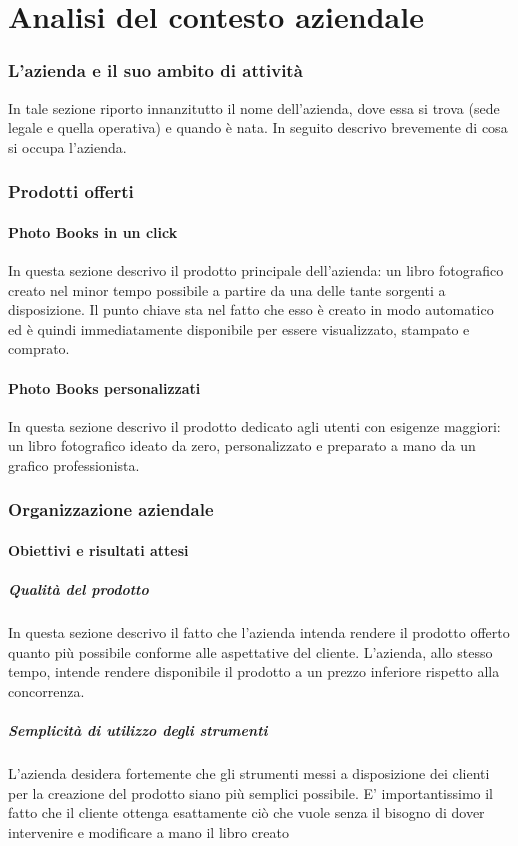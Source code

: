 \part{Analisi del contesto aziendale}
	\section{L'azienda e il suo ambito di attività}
		In tale sezione riporto innanzitutto il nome dell'azienda, dove essa si trova (sede legale e quella operativa) e quando è nata. In
		seguito descrivo brevemente di cosa si occupa l'azienda.
	\section{Prodotti offerti}
		\subsection{Photo Books in un click}
			In questa sezione descrivo il prodotto principale dell'azienda: un libro fotografico creato nel minor tempo possibile a
			partire da una delle tante sorgenti a disposizione. Il punto chiave sta nel fatto che esso è creato in modo automatico ed è
			quindi immediatamente disponibile per essere visualizzato, stampato e comprato.
		\subsection{Photo Books personalizzati}
			In questa sezione descrivo il prodotto dedicato agli utenti con esigenze maggiori: un libro fotografico ideato da zero,
			personalizzato e preparato a mano da un grafico professionista.
	\section{Organizzazione aziendale}
		\subsection{Obiettivi e risultati attesi}
			\subsubsection{Qualità del prodotto}
				In questa sezione descrivo il fatto che l'azienda intenda rendere il prodotto offerto quanto più possibile conforme
				alle aspettative del cliente. L'azienda, allo stesso tempo, intende rendere disponibile il prodotto a un prezzo
				inferiore rispetto alla concorrenza.
			\subsubsection{Semplicità di utilizzo degli strumenti}
				L'azienda desidera fortemente che gli strumenti messi a disposizione dei clienti per la creazione del prodotto siano
				più semplici possibile. E' importantissimo il fatto che il cliente ottenga esattamente ciò che vuole senza il bisogno
				di dover intervenire e modificare a mano il libro creato
